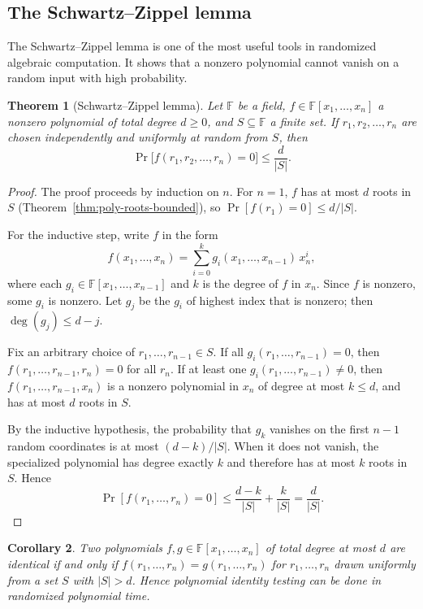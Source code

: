 \documentclass[twoside,12pt]{book}
\theoremstyle{plain}
\newtheorem{theorem}{Theorem}[chapter]
\newtheorem{corollary}[theorem]{Corollary}
\theoremstyle{definition}
\theoremstyle{remark}
\begin{document}
\subsection{The Schwartz--Zippel lemma}

The Schwartz--Zippel lemma is one of the most useful tools in randomized algebraic computation. It shows that a nonzero polynomial cannot vanish on a random input with high probability.

\begin{theorem}[Schwartz--Zippel lemma]
\label{thm:schwartz-zippel-bis}
Let $\mathbb{F}$ be a field, $f \in \mathbb{F}[x_1, \ldots, x_n]$ a nonzero polynomial of total degree $d \geq 0$, and $S \subseteq \mathbb{F}$ a finite set. If $r_1, r_2, \ldots, r_n$ are chosen independently and uniformly at random from $S$, then
\[
\Pr\bigl[f(r_1, r_2, \ldots, r_n) = 0\bigr] \leq \frac{d}{|S|}.
\]
\end{theorem}

\begin{proof}
The proof proceeds by induction on $n$. For $n = 1$, $f$ has at most $d$ roots in $S$ (Theorem~\ref{thm:poly-roots-bounded}), so $\Pr[f(r_1) = 0] \leq d/|S|$.

For the inductive step, write $f$ in the form
\[
f(x_1, \ldots, x_n) = \sum_{i=0}^{k} g_i(x_1, \ldots, x_{n-1}) \, x_n^i,
\]
where each $g_i \in \mathbb{F}[x_1, \ldots, x_{n-1}]$ and $k$ is the degree of $f$ in $x_n$. Since $f$ is nonzero, some $g_i$ is nonzero. Let $g_j$ be the $g_i$ of highest index that is nonzero; then $\deg(g_j) \leq d - j$.

Fix an arbitrary choice of $r_1, \ldots, r_{n-1} \in S$. If all $g_i(r_1, \ldots, r_{n-1}) = 0$, then $f(r_1, \ldots, r_{n-1}, r_n) = 0$ for all $r_n$. If at least one $g_i(r_1, \ldots, r_{n-1}) \neq 0$, then $f(r_1, \ldots, r_{n-1}, x_n)$ is a nonzero polynomial in $x_n$ of degree at most $k \leq d$, and has at most $d$ roots in $S$.

By the inductive hypothesis, the probability that $g_k$ vanishes on the
first $n-1$ random coordinates is at most $(d-k)/|S|$.  When it does not
vanish, the specialized polynomial has degree exactly $k$ and therefore
has at most $k$ roots in $S$.  Hence
\[
\Pr[f(r_1,\ldots,r_n)=0]
\leq \frac{d-k}{|S|}+\frac{k}{|S|}=\frac{d}{|S|}.
\]
\end{proof}

\begin{corollary}
\label{cor:sz-identity}
Two polynomials $f, g \in \mathbb{F}[x_1, \ldots, x_n]$ of total degree at most $d$ are identical if and only if $f(r_1, \ldots, r_n) = g(r_1, \ldots, r_n)$ for $r_1, \ldots, r_n$ drawn uniformly from a set $S$ with $|S| > d$. Hence polynomial identity testing can be done in randomized polynomial time.
\end{corollary}
\end{document}
